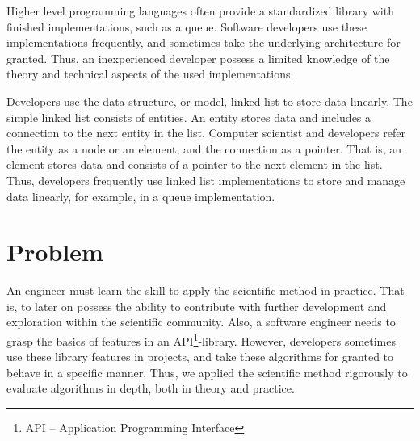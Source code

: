 \documentclass[a4paper,11pt]{kth-mag}
\newcommand*{\skippara}{\par\vspace{\baselineskip} \noindent}
\begin{document}
\skippara Higher level programming languages often provide a standardized library with finished implementations, such as a queue.
Software developers use these implementations frequently, and sometimes take the underlying architecture for granted.
Thus, an inexperienced developer possess a limited knowledge of the theory and technical aspects of the used implementations.

\skippara Developers use the data structure, or model, linked list to store data linearly.
The simple linked list consists of entities. 
An entity stores data and includes a connection to the next entity in the list. 
Computer scientist and developers refer the entity as a node or an element, and the connection as a pointer.
That is, an element stores data and consists of a pointer to the next element in the list.
Thus, developers frequently use linked list implementations to store and manage data linearly, for example, in a queue implementation.  


\section{Problem}\label{sec:problem}
An engineer must learn the skill to apply the scientific method in practice.
That is, to later on possess the ability to contribute with further development and exploration within the scientific community.
Also, a software engineer needs to grasp the basics of features in an API\footnote{API -- Application Programming Interface}-library.
However, developers sometimes use these library features in projects, and take these algorithms for granted to behave in a specific manner.
Thus, we applied the scientific method rigorously to evaluate algorithms in depth, both in theory and practice.
\end{document}
